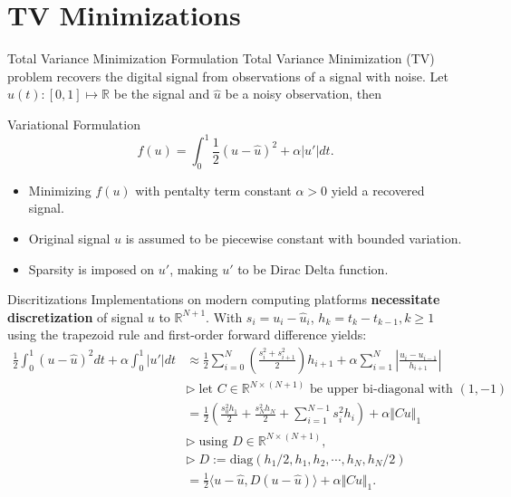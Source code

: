 \documentclass[11pt]{beamer}
\theoremstyle{definition}
\begin{document}
\section{TV Minimizations}
    \begin{frame}{Total Variance Minimization Formulation}
        Total Variance Minimization (TV) problem recovers the digital signal from observations of a signal with noise. 
        Let $u(t):[0, 1]\mapsto \mathbb R$ be the signal and $\hat u$ be a noisy observation, then
        \begin{block}{Variational Formulation}
            \[
                f(u) = \int_0^1 \frac{1}{2} 
                (u - \hat u)^2 + \alpha |u'|dt. 
            \]    
        \end{block}
        \begin{itemize}
            \item Minimizing $f(u)$ with pentalty term constant $\alpha > 0$ yield a recovered signal. 
            \item Original signal $u$ is assumed to be piecewise constant with bounded variation. 
            \item Sparsity is imposed on $u'$, making $u'$ to be Dirac Delta function. 
        \end{itemize}
        
    \end{frame}
    \begin{frame}{Discritizations}
        Implementations on modern computing platforms \textbf{necessitate discretization} of signal $u$ to $\mathbb R^{N + 1}$. 
        With $s_i = u_i - \hat u_i$, $h_k = t_k - t_{k -1}, k\ge 1$ using the trapezoid rule and first-order forward difference yields:
        {\scriptsize
        \begin{align*}
            \frac{1}{2}\int_{0}^{1} (u - \hat u)^2 dt + 
            \alpha \int_0^1 |u'| dt
            &\approx
            \frac{1}{2}
            \sum_{i = 0}^{N}
            \left(
                \frac{s_i^2 + s_{i + 1}^2}{2}
            \right)h_{i + 1}
            + 
            \alpha
            \sum_{i = 1}^{N}
            \left|
                \frac{u_{i} - u_{i - 1}}{h_{i + 1}}
            \right|
            \\
            & \triangleright\; \text{let } 
            C\in \mathbb R^{N\times (N + 1)} \text{ be upper bi-diagonal with }(1, -1)
            \\
            &= \frac{1}{2}\left(
                \frac{s_0^2h_1}{2} + \frac{s_N^2h_N}{2}
                + 
                \sum_{i = 1}^{N - 1}s_i^2 h_i
            \right) + \alpha\Vert Cu\Vert_1
            \\
            & 
            \triangleright \; \text{using } D\in \mathbb R^{N \times (N + 1)},
            \\
            & \triangleright\; D := \text{diag}(h_1/2, h_1, h_2, \cdots, h_N, h_N/2)
            \\
            &= 
            \frac{1}{2}\langle u - \hat u, D(u - \hat u)\rangle + \alpha \Vert Cu\Vert_1. 
        \end{align*}
        }
    \end{frame}
\end{document}
